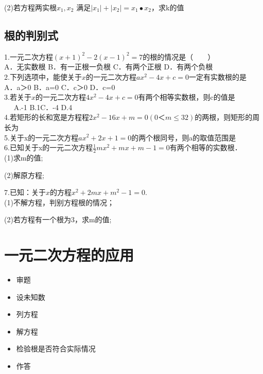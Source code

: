 (2)若方程两实根$x_1,x_2$ 满足$|x_1|+|x_2|=x_1•x_2$，求k的值\\
\vspace{2cm}

\subsection{根的判别式}
1.一元二次方程$(x+1)^2-2(x-1)^2=7$的根的情况是（　　）\\
A．无实数根  \hfill B．有一正根一负根 \hfill C．有两个正根	 \hfill D．有两个负根\\
2.下列选项中，能使关于$x$的一元二次方程$ax^2-4x+c=0$一定有实数根的是\\
A．a＞0 \hfill B．a=0 \hfill C．c＞0 \hfill D．c=0\\
3.若关于$x$的一元二次方程$4x^2-4x+c=0$有两个相等实数根，则c的值是\\
　	A.-1 \hfill	B.1\hfill C．-4  \hfill D.4\\
4.若矩形的长和宽是方程程$2x^2-16x+m=0(0＜m\leq 32)$的两根，则矩形的周长为\\
5.关于x的一元二次方程$ax^2 +2x+1=0$的两个根同号，则a的取值范围是\\
6.已知关于x的一元二次方程$\frac{1}{2} mx^2+mx+m-1=0$有两个相等的实数根．\\
(1)求m的值;\\
\vspace{2cm}

(2)解原方程;\\
\vspace{2cm}

7.已知：关于$x$的方程$x^2+2mx+m^2-1=0$.\\
(1)不解方程，判别方程根的情况；\\
\hspace{2cm}

(2)若方程有一个根为3，求m的值;
\hspace{2cm}

\section{一元二次方程的应用}
\begin{itemize}
\item 审题
\item 设未知数
\item 列方程
\item 解方程
\item 检验根是否符合实际情况
\item 作答
\end{itemize}
